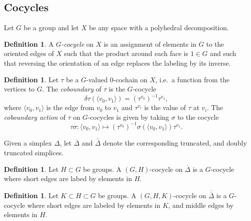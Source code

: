 \documentclass[12pt]{amsart}
\theoremstyle{definition}
\newtheorem{definition}[theorem]{Definition}
\numberwithin{equation}{section}
\def\truncsimp{\overline{\Delta}}
\def\dtruncsimp{\overline{\overline{\Delta}}}
\begin{document}




\subsection{Cocycles} Let $G$ be a group and let $X$ be any space with a polyhedral decomposition.

\begin{definition}\label{def:GCocycle}
A \emph{$G$-cocycle} on $X$ is an assignment of elements in $G$ to the oriented edges of $X$ such that the product around each face is $1\in G$ and such that reversing the orientation of an edge replaces the labeling by its inverse.
\end{definition}

\begin{definition}
Let $\tau$ be a $G$-valued $0$-cochain on $X$, i.e.~a function from the vertices to $G$. The \emph{coboundary} of $\tau$ is the $G$-cocycle
\begin{equation}
\delta\tau(\langle v_0,v_1\rangle)=(\tau^{v_0})^{-1}\tau^{v_1},
\end{equation}
where $\langle v_0,v_1\rangle$ is the edge from $v_0$ to $v_1$ and $\tau^{v_i}$ is the value of $\tau$ at $v_i$.
The \emph{coboundary action} of $\tau$ on $G$-cocycles is given by taking $\sigma$ to the cocycle
\begin{equation}\label{eq:CoboundaryAction}
\tau\sigma\colon\langle v_0,v_1\rangle\mapsto (\tau^{v_0})^{-1}\sigma(\langle v_0,v_1\rangle)\tau^{v_1}.
\end{equation}
\end{definition}

Given a simplex $\Delta$, let $\truncsimp$ and $\dtruncsimp$ denote the corresponding truncated, and doubly truncated simplices.
\begin{definition} Let $H\subset G$ be groups. A $(G,H)$-cocycle on $\truncsimp$ is a $G$-cocycle where short edges are labed by elements in $H$. 
\end{definition}

\begin{definition} Let $K\subset H\subset G$ be groups. A $(G,H,K)$-cocycle on $\dtruncsimp$ is a $G$-cocycle where short edges are labeled by elements in $K$, and middle edges by elements in $H$.
\end{definition}
\end{document}
